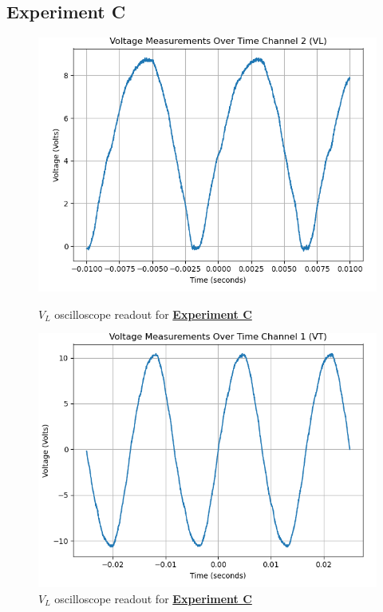 \documentclass[
	letterpaper
	12pt
]{template}
\newcommand{\bref}[2]{\textbf{\hyperref[#1]{#2}}}
\begin{document}
\subsection{Experiment C}
\begin{figure}[H]\label{data::C}
	\centering
	\begin{minipage}[c]{0.45\textwidth}
		\centering
		\includegraphics[width=\textwidth]{figures/C/1--ch2.png}
		\caption{$V_{L}$ oscilloscope readout for \bref{exp::C}{Experiment C}}
	\end{minipage}
	\hfill
	\begin{minipage}[c]{0.45\textwidth}
		\centering
		\includegraphics[width=\textwidth]{figures/C/2--ch1.png}
		\caption{$V_{L}$ oscilloscope readout for \bref{exp::C}{Experiment C}}
	\end{minipage}
\end{figure}
\end{document}
